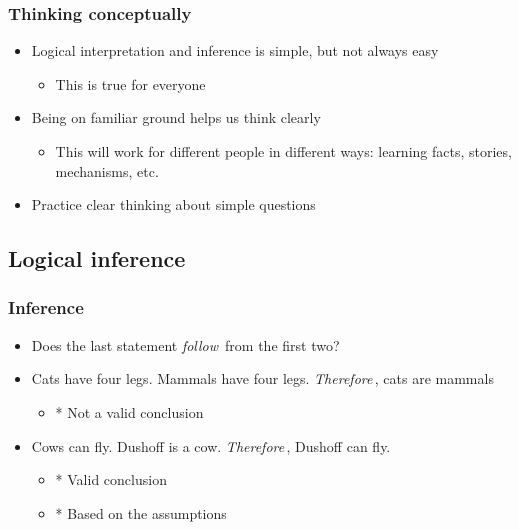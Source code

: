 \documentclass{beamer}
\begin{document}
\begin{frame}


\frametitle{Thinking conceptually}\begin{itemize}

\item Logical interpretation and inference is simple, but not always easy\begin{itemize}

\item This is true for everyone\end{itemize}

\item Being on familiar ground helps us think clearly\begin{itemize}

\item This will work for different people in different ways: learning
		facts, stories, mechanisms, etc.\end{itemize}

\item Practice clear thinking about simple questions\end{itemize}
\end{frame}


 \subsection{Logical inference}
\begin{frame}


\frametitle{Inference}\begin{itemize}

\item Does the last statement {\em follow\,} from the first two?

\item Cats have four legs.  Mammals have four legs.  {\em Therefore\,}, cats are mammals\begin{itemize}

\item * {\color{blue} Not a valid conclusion}\end{itemize}

\item Cows can fly.  Dushoff is a cow.  {\em Therefore\,}, Dushoff can fly.\begin{itemize}

\item * {\color{blue} Valid conclusion}

\item * {\color{blue} Based on the assumptions}\end{itemize}\end{itemize}
\end{frame}
\end{document}
